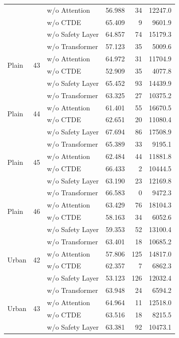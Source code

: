 \begin{longtable}{lllrrr}
 &  & w/o Attention & 56.988 & 34 & 12247.0 \\
 &  & w/o CTDE & 65.409 & 9 & 9601.9 \\
 &  & w/o Safety Layer & 64.857 & 74 & 15179.3 \\
\midrule
\multirow{4}{*}{Plain} & \multirow{4}{*}{43} & w/o Transformer & 57.123 & 35 & 5009.6 \\
 &  & w/o Attention & 64.972 & 31 & 11704.9 \\
 &  & w/o CTDE & 52.909 & 35 & 4077.8 \\
 &  & w/o Safety Layer & 65.452 & 93 & 14439.9 \\
\midrule
\multirow{4}{*}{Plain} & \multirow{4}{*}{44} & w/o Transformer & 63.325 & 27 & 10375.2 \\
 &  & w/o Attention & 61.401 & 55 & 16670.5 \\
 &  & w/o CTDE & 62.651 & 20 & 11080.4 \\
 &  & w/o Safety Layer & 67.694 & 86 & 17508.9 \\
\midrule
\multirow{4}{*}{Plain} & \multirow{4}{*}{45} & w/o Transformer & 65.389 & 33 & 9195.1 \\
 &  & w/o Attention & 62.484 & 44 & 11881.8 \\
 &  & w/o CTDE & 66.433 & 2 & 10444.5 \\
 &  & w/o Safety Layer & 63.190 & 23 & 12169.8 \\
\midrule
\multirow{4}{*}{Plain} & \multirow{4}{*}{46} & w/o Transformer & 66.583 & 0 & 9472.3 \\
 &  & w/o Attention & 63.429 & 76 & 18104.3 \\
 &  & w/o CTDE & 58.163 & 34 & 6052.6 \\
 &  & w/o Safety Layer & 59.353 & 52 & 13100.4 \\
\midrule
\multirow{4}{*}{Urban} & \multirow{4}{*}{42} & w/o Transformer & 63.401 & 18 & 10685.2 \\
 &  & w/o Attention & 57.806 & 125 & 14817.0 \\
 &  & w/o CTDE & 62.357 & 7 & 6862.3 \\
 &  & w/o Safety Layer & 53.123 & 126 & 12032.4 \\
\midrule
\multirow{4}{*}{Urban} & \multirow{4}{*}{43} & w/o Transformer & 63.948 & 24 & 6594.2 \\
 &  & w/o Attention & 64.964 & 11 & 12518.0 \\
 &  & w/o CTDE & 63.516 & 18 & 8215.5 \\
 &  & w/o Safety Layer & 63.381 & 92 & 10473.1 \\

\end{longtable}
